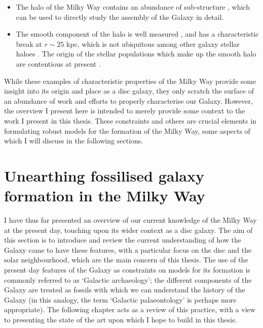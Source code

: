 \begin{itemize}
    \item The halo of the Milky Way contains an abundance of sub-structure \citep{2013NewAR..57..100B}, which can be used to directly study the assembly of the Galaxy in detail.
    \item The smooth component of the halo is well measured \citep[e.g.][]{2011MNRAS.416.2903D}, and has a characteristic break at $r\sim 25$ kpc, which is not ubiquitous among other galaxy stellar haloes \citep[e.g.][]{2013ApJ...763..113D}. The origin of the stellar populations which make up the smooth halo are contentious at present \citep[e.g.][]{2007Natur.450.1020C,2012ApJ...746...34B,2014ApJ...786....7S}.
\end{itemize}

While these examples of characteristic properties of the Milky Way provide some insight into its origin and place as a disc galaxy, they only scratch the surface of an abundance of work and efforts to properly characterise our Galaxy. However, the overview I present here is intended to merely provide some context to the work I present in this thesis. These constraints and others are crucial elements in formulating robust models for the formation of the Milky Way, some aspects of which I will discuss in the following sections.

\section{Unearthing fossilised galaxy formation in the Milky Way}
\label{sec:galacticarchaeology}

I have thus far presented an overview of our current knowledge of the Milky Way at the present day, touching upon its wider context as a disc galaxy. The aim of this section is to introduce and review the current understanding of how the Galaxy came to have these features, with a particular focus on the disc and the solar neighbourhood, which are the main concern of this thesis. The use of the present day features of the Galaxy as constraints on models for its formation is commonly referred to as `Galactic archaeology'; the different components of the Galaxy are treated as fossils with which we can understand the history of the Galaxy (in this analogy, the term `Galactic palaeontology' is perhaps more appropriate). The following chapter acts as a review of this practice, with a view to presenting the state of the art upon which I hope to build in this thesis.

